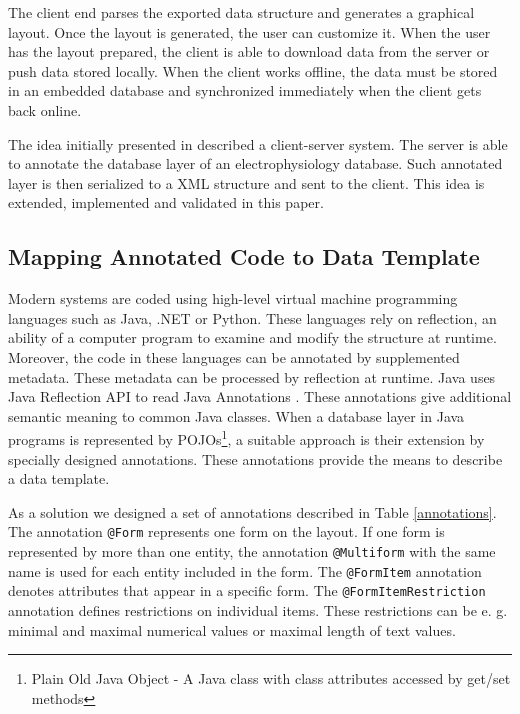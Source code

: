 \documentclass[conference]{IEEEtran}
\begin{document}
The client end parses the exported data structure and generates a graphical layout. Once the layout is generated, the user can customize it. When the user has the layout prepared, the client is able to download data from the server or push data stored locally. When the client works offline, the data must be stored in an embedded database and synchronized immediately when the client gets back online.



The idea initially presented in \cite{6645264} described a client-server system. The server is able to annotate the database layer of an electrophysiology database. Such annotated layer is then serialized to a XML structure and sent to the client. This idea is extended, implemented and validated in this paper.

\subsection{Mapping Annotated Code to Data Template}\label{Mapping_Code_To_Template}

Modern systems are coded using high-level virtual machine programming languages such as Java, .NET or Python. These languages rely on reflection, an ability of a computer program to examine and modify the structure at runtime. Moreover, the code in these languages can be annotated by supplemented metadata. These metadata can be processed by reflection at runtime. Java uses Java Reflection API \cite{1932394184} to read Java Annotations \cite{AnnotationsJavaDevGuide}. These annotations give additional semantic meaning to common Java classes. When a database layer in Java programs is represented by POJOs\footnote{Plain Old Java Object - A Java class with class attributes accessed by get/set methods}, a suitable approach is their extension by specially designed annotations. These annotations provide the means to describe a data template.

As a solution we designed a set of annotations described in Table \ref{annotations}. The annotation \texttt{@Form} represents one form on the layout. If one form is represented by more than one entity, the annotation \texttt{@Multiform} with the same name is used for each entity included in the form. The \texttt{@FormItem} annotation denotes attributes that appear in a specific form. The \texttt{@FormItemRestriction} annotation defines restrictions on individual items. These restrictions can be e. g. minimal and maximal numerical values or maximal length of text values.
\end{document}
